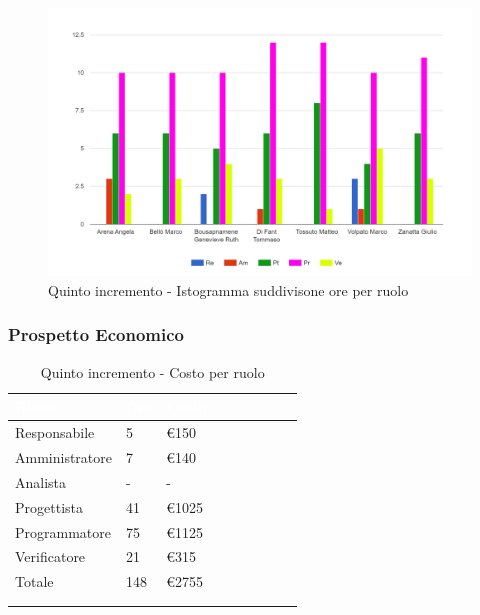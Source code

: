 {{      \begin{figure}[H]
        \includegraphics[width=15cm]{sezioni/images/quinto.png}
        \centering
        \caption{Quinto incremento - Istogramma suddivisone ore per ruolo}
     \end{figure}
    }

    \subsubsection{Prospetto Economico}
    {
        \setlength{\freewidth}{\dimexpr\textwidth-30\tabcolsep}
        \renewcommand{\arraystretch}{1.0}
        \setlength{\aboverulesep}{0pt}
        \setlength{\belowrulesep}{0pt}
        \begin{longtable}{C{.4\freewidth} C{.2\freewidth} C{.2\freewidth} C{.2\freewidth} C{.2\freewidth} C{.2\freewidth} C{.2\freewidth} C{.2\freewidth} C{.2\freewidth}}
          \toprule
        \textcolor{white}{\textbf{Ruolo}}&
        \textcolor{white}{\textbf{Ore}}&
        \textcolor{white}{\textbf{Costo}}\\
        \toprule
        \endhead
            
        Responsabile  & 5 & \euro150\\
        Amministratore  & 7 & \euro140 \\
        Analista &- & -\\
        Progettista &41 &\euro1025\\
        Programmatore &75 & \euro1125\\
        Verificatore &21 &\euro315\\
        Totale&148&\euro2755\\
        \bottomrule
      \\
        \caption{Quinto incremento - Costo per ruolo}


\end{longtable}}}
